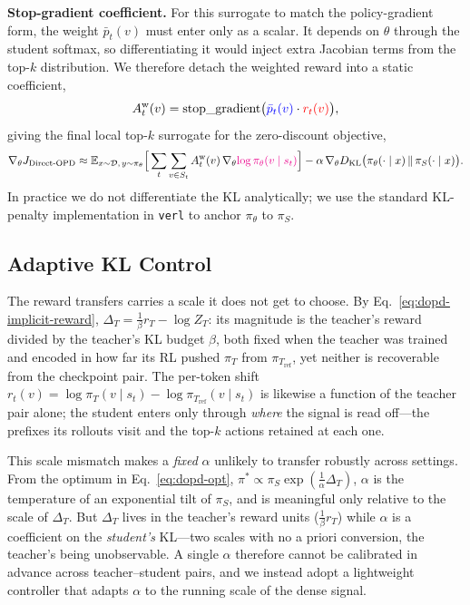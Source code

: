 \textbf{Stop-gradient coefficient.}
For this surrogate to match the policy-gradient form, the weight $\bar p_t(v)$
must enter only as a scalar. It depends on $\theta$ through the student softmax,
so differentiating it would inject extra Jacobian terms from the top-$k$
distribution. We therefore detach the weighted reward into a static coefficient,
\begin{equation}
    A_t^{\mathrm{w}}(v) =
    \operatorname{stop\_gradient}\!\big(
    \textcolor{blue}{\bar p_t(v)} \cdot
    \textcolor{red}{r_t(v)}
    \big),
\end{equation}
giving the final local top-$k$ surrogate for the zero-discount objective,
\begin{equation}
    \nabla_\theta J_{\text{Direct-OPD}} \approx
    \mathbb{E}_{x \sim \mathcal{D},\, y \sim \pi_\theta} \Big[
    \sum_t \sum_{v \in S_t}
    A_t^{\mathrm{w}}(v)\,
    \nabla_\theta
    \textcolor{magenta}{\log \pi_\theta(v \mid s_t)}
    \Big]
    - \alpha\, \nabla_\theta
    D_{\mathrm{KL}}\big(
    \pi_\theta(\cdot\mid x) \,\|\, \pi_S(\cdot\mid x)
    \big).
\end{equation}
In practice we do not differentiate the KL analytically; we use the standard
KL-penalty implementation in \texttt{verl} to anchor $\pi_\theta$ to $\pi_S$.

\subsection{Adaptive KL Control}
\label{sec:method-adaptive-kl}

The reward \method{} transfers carries a scale it does not get to choose. By
Eq.~\ref{eq:dopd-implicit-reward}, $\Delta_T=\tfrac{1}{\beta}r_T-\log Z_T$: its magnitude is the teacher's reward divided by the teacher's KL budget $\beta$, both fixed when the teacher was trained and encoded in how far its RL pushed $\pi_T$ from $\pi_{T_{\mathrm{ref}}}$, yet neither is recoverable from the checkpoint pair.
The per-token shift $r_t(v)=\log\pi_T(v\mid s_t)-\log\pi_{T_{\mathrm{ref}}}
(v\mid s_t)$ is likewise a function of the teacher pair alone; the student enters
only through \emph{where} the signal is read off---the prefixes its rollouts
visit and the top-$k$ actions retained at each one.

This scale mismatch makes a \emph{fixed} $\alpha$ unlikely to transfer robustly
across settings. From the optimum in Eq.~\ref{eq:dopd-opt},
$\pi^*\propto\pi_S\exp(\tfrac{1}{\alpha}\Delta_T)$, $\alpha$ is the temperature
of an exponential tilt of $\pi_S$, and is meaningful only relative to the scale
of $\Delta_T$. But $\Delta_T$ lives in the teacher's reward units
($\tfrac1\beta r_T$) while $\alpha$ is a coefficient on the \emph{student's}
KL---two scales with no a priori conversion, the teacher's being unobservable.
A single $\alpha$ therefore cannot be calibrated in advance across teacher--student pairs, and we instead adopt a lightweight controller that adapts $\alpha$ to the running scale of the dense signal.

